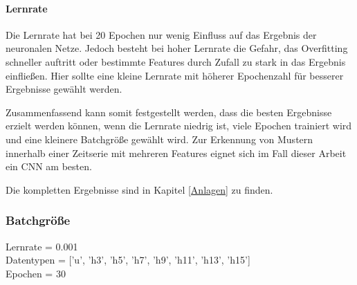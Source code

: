    \paragraph{Lernrate}
    Die Lernrate hat bei 20 Epochen nur wenig Einfluss auf das Ergebnis der neuronalen Netze.
    Jedoch besteht bei hoher Lernrate die Gefahr, das Overfitting schneller auftritt oder bestimmte Features durch Zufall zu stark in das Ergebnis einfließen.
    Hier sollte eine kleine Lernrate mit höherer Epochenzahl für besserer Ergebnisse gewählt werden.
    \newline

    \noindent
    Zusammenfassend kann somit festgestellt werden, dass die besten Ergebnisse erzielt werden können, wenn die Lernrate niedrig ist, viele Epochen trainiert wird und eine kleinere Batchgröße gewählt wird.
    Zur Erkennung von Mustern innerhalb einer Zeitserie mit mehreren Features eignet sich im Fall dieser Arbeit ein \ac{CNN} am besten.
    \newline

    Die kompletten Ergebnisse sind in Kapitel \ref{Anlagen} zu finden.

    \subsubsection{Batchgröße}

        Lernrate = 0.001\\
        \noindent
        Datentypen = ['u', 'h3', 'h5', 'h7', 'h9', 'h11', 'h13', 'h15']\\
        \noindent
        Epochen = 30\\

